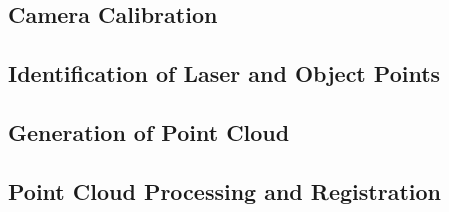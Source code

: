 
\subsection{Camera Calibration}
\label{subsection:camera-calibration}


\subsection{Identification of Laser and Object Points}
\label{subsection:search-laser}


\subsection{Generation of Point Cloud}
\label{subsection:generate-pointcloud}


\subsection{Point Cloud Processing and Registration}
\label{subsection:registration}
